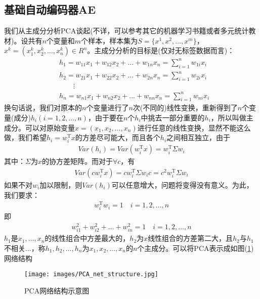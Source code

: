     \subsection{基础自动编码器AE}
        \par
        我们从主成分分析PCA谈起(不详，可以参考其它的机器学习书籍或者多元统计教材)。设共有$n$个变量和$m$个样本，样本集为$S=\{x^1,x^2,\dots,x^m\}$，$x^k = (x_1^k,x_2^k,\dots,x_n^k)\in R^n$。主成分分析的目标是(仅对无标签数据而言)：
        \begin{align*}
        & h_1 = w_{11}x_1 + w_{12}x_ 2+ \dots + w_{1n}x_n = \sum_{i=1}^n w_{1i}x_i\\
        & h_2 = w_{21}x_1 + w_{22}x_ 2+ \dots + w_{2n}x_n = \sum_{i=1}^n w_{2i}x_i\\
        & \qquad \vdots\\
        & h_n = w_{n1}x_1 + w_{n2}x_ 2+ \dots + w_{nn}x_n = \sum_{i=1}^n w_{ni}x_i
        \end{align*}
        换句话说，我们对原本的$n$个变量进行了$n$次(不同的)线性变换，重新得到了$n$个变量(成分)$h_i(i=1,2,\dots,n)$，由于要在$n$个$h_i$中挑去一部分重要的$h_i$，所以叫做主成分。可以对原始变量$x = (x_1,x_2,\dots,x_n)$进行任意的线性变换，显然不能这么做，我们希望$h_i = w_i^\mathrm{T}x$的方差尽可能大，而且各个$h_i$之间相互独立，由于
        \begin{align*}
        Var(h_i) = Var(w_i^\mathrm{T}x) = w_i^\mathrm{T}\Sigma w_i
        \end{align*}
        其中：$\Sigma$为$x$的协方差矩阵。而对于$\forall c$，有
        \begin{align*}
        Var(cw_i^\mathrm{T}x) = cw_i^\mathrm{T}\Sigma w_i c = c^2w_i^\mathrm{T}\Sigma w_i
        \end{align*}
        如果不对$w_i$加以限制，则$Var(h_i)$可以任意增大，问题将变得没有意义。为此，我们要求：
        \begin{align*}
        w_i^\mathrm{T}w_i = 1 \quad i=1,2,\dots,n
        \end{align*}
        即
        \begin{align*}
        w_{i1}^2+w_{i2}^2+\dots+w_{in}^2 = 1 \quad i=1,2,\dots,n
        \end{align*}
        $h_1$是$x_1,\dots,x_n$的线性组合中方差最大的，$h_2$为$x$线性组合的方差第二大，且$h_2$与$h_1$不相关$\dots$，称$h_1,h_2,\dots,h_n$为$x_1,x_2,\dots,x_n$的$n$个主成分。可以将PCA表示成如图(\ref{fig:PCA网络结构示意图})网络结构
            \begin{figure}[H]
            \centering
            \texttt{[image: images/PCA\_net\_structure.jpg]}
            \caption{PCA网络结构示意图}
            \label{fig:PCA网络结构示意图}
            \end{figure}
